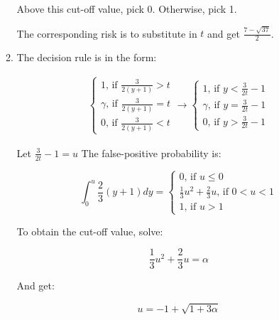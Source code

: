 \documentclass[11pt,letterpaper,titlepage]{article}
\begin{document}
\begin{enumerate}
\begin{enumerate}
        Above this cut-off value, pick 0. Otherwise, pick 1.
        
        The corresponding risk is to substitute in $t$ and get $\frac{7 - \sqrt{37}}{2}$.
        
        \item %
        
        The decision rule is in the form:
        
        \begin{gather*}
            \begin{cases}
                1 \text{, if } \frac{3}{2(y+1)} > t \\
                \gamma \text{, if } \frac{3}{2(y+1)} = t \\
                0 \text{, if } \frac{3}{2(y+1)} < t
            \end{cases}
            \rightarrow 
            \begin{cases}
                1 \text{, if } y < \frac{3}{2t} - 1 \\
                \gamma \text{, if } y = \frac{3}{2t} - 1 \\
                0 \text{, if } y > \frac{3}{2t} - 1
            \end{cases}
        \end{gather*}
        
        Let $\frac{3}{2t} - 1 = u$ The false-positive probability is:
        
        \begin{equation*}
            \int_0^{u} \frac{2}{3}(y + 1) dy = 
            \begin{cases}
                0 \text{, if } u \leq 0 \\
                \frac{1}{3} u^2 + \frac{2}{3} u \text{, if } 0 < u < 1 \\
                1 \text{, if } u > 1
            \end{cases}
        \end{equation*}
        
        To obtain the cut-off value, solve:
        
        \begin{equation*}
            \frac{1}{3} u^2 + \frac{2}{3} u = \alpha
        \end{equation*}
        
        And get:
        
        \begin{equation*}
            u = -1 + \sqrt{1 + 3 \alpha}
        \end{equation*}
        

\end{enumerate}
\end{enumerate}
\end{document}
